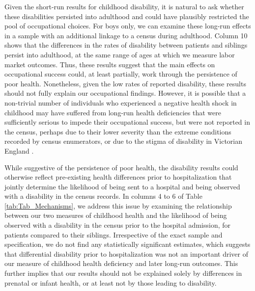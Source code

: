 \documentclass[12pt,english]{article}
\begin{document}
Given the short-run results for childhood disability, it is natural to ask whether these disabilities persisted into adulthood and could have plausibly restricted the pool of occupational choices. For boys only, we can examine these long-run effects in a sample with an additional linkage to a census during adulthood. Column 10 shows that the differences in the rates of disability between patients and siblings persist into adulthood, at the same range of ages at which we measure labor market outcomes. Thus, these results suggest that the main effects on occupational success could, at least partially, work through the persistence of poor health. Nonetheless, given the low rates of reported disability, these results should not fully explain our occupational findings. However, it is possible that a non-trivial number of individuals who experienced a negative health shock in childhood may have suffered from long-run health deficiencies that were sufficiently serious to impede their occupational success, but were not reported in the census, perhaps due to their lower severity than the extreme conditions recorded by census enumerators, or due to the stigma of disability in Victorian England \citep{Cohen2014}.

While suggestive of the persistence of poor health, the disability results could otherwise reflect pre-existing health differences prior to hospitalization that jointly determine the likelihood of being sent to a hospital and being observed with a disability in the census records. In columns 4 to 6 of Table \ref{tab:Tab_Mechanisms}, we address this issue by examining the relationship between our two measures of childhood health and the likelihood of being observed with a disability in the census prior to the hospital admission, for patients compared to their siblings. Irrespective of the exact sample and specification, we do not find any statistically significant estimates, which suggests that differential disability prior to hospitalization was not an important driver of our measure of childhood health deficiency and later long-run outcomes. This further implies that our results should not be explained solely by differences in prenatal or infant health, or at least not by those leading to disability.  
\end{document}
